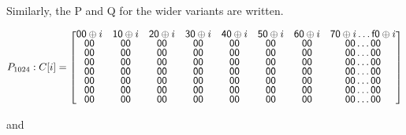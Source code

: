 \begin{itemize}
    Similarly, the P and Q for the wider variants are written.

    $ P_{1024}: C[i] = \renewcommand\arraystretch{0.75}
    \begin{bmatrix}
      \mathsf{00} \oplus i & \mathsf{10} \oplus i & \mathsf{20} \oplus i & \mathsf{30} \oplus i & \mathsf{40} \oplus i & \mathsf{50} \oplus i & \mathsf{60} \oplus i & \mathsf{70} \oplus i \ldots \mathsf{f0} \oplus i \\
      \mathsf{00} & \mathsf{00} & \mathsf{00} & \mathsf{00} & \mathsf{00} & \mathsf{00} & \mathsf{00} & \mathsf{00} \dots \mathsf{00} \\
      \mathsf{00} & \mathsf{00} & \mathsf{00} & \mathsf{00} & \mathsf{00} & \mathsf{00} & \mathsf{00} & \mathsf{00} \dots \mathsf{00} \\
      \mathsf{00} & \mathsf{00} & \mathsf{00} & \mathsf{00} & \mathsf{00} & \mathsf{00} & \mathsf{00} & \mathsf{00} \dots \mathsf{00} \\
      \mathsf{00} & \mathsf{00} & \mathsf{00} & \mathsf{00} & \mathsf{00} & \mathsf{00} & \mathsf{00} & \mathsf{00} \dots \mathsf{00} \\
      \mathsf{00} & \mathsf{00} & \mathsf{00} & \mathsf{00} & \mathsf{00} & \mathsf{00} & \mathsf{00} & \mathsf{00} \dots \mathsf{00} \\
      \mathsf{00} & \mathsf{00} & \mathsf{00} & \mathsf{00} & \mathsf{00} & \mathsf{00} & \mathsf{00} & \mathsf{00} \dots \mathsf{00} \\
      \mathsf{00} & \mathsf{00} & \mathsf{00} & \mathsf{00} & \mathsf{00} & \mathsf{00} & \mathsf{00} & \mathsf{00} \dots \mathsf{00} \\
    \end{bmatrix}$

    and 


\end{itemize}
